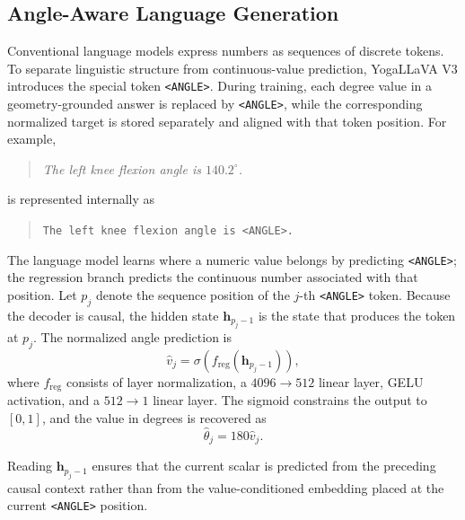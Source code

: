 \subsection{Angle-Aware Language Generation}
\label{sec:angle_generation}

Conventional language models express numbers as sequences of discrete
tokens. To separate linguistic structure from continuous-value
prediction, YogaLLaVA V3 introduces the special token
\texttt{<ANGLE>}. During training, each degree value in a
geometry-grounded answer is replaced by \texttt{<ANGLE>}, while the
corresponding normalized target is stored separately and aligned with
that token position. For example,
\begin{quote}
\small
\textit{The left knee flexion angle is $140.2^\circ$.}
\end{quote}
is represented internally as
\begin{quote}
\small
\texttt{The left knee flexion angle is <ANGLE>.}
\end{quote}

The language model learns where a numeric value belongs by predicting
\texttt{<ANGLE>}; the regression branch predicts the continuous number
associated with that position. Let $p_j$ denote the sequence position of
the $j$-th \texttt{<ANGLE>} token. Because the decoder is causal, the
hidden state $\mathbf{h}_{p_j-1}$ is the state that produces the token at
$p_j$. The normalized angle prediction is
\begin{equation}
    \widehat{v}_j
    =
    \sigma\!\left(
        f_{\mathrm{reg}}
        \left(
            \mathbf{h}_{p_j-1}
        \right)
    \right),
    \label{eq:angle_regression}
\end{equation}
where $f_{\mathrm{reg}}$ consists of layer normalization, a
$4096\!\rightarrow\!512$ linear layer, GELU activation, and a
$512\!\rightarrow\!1$ linear layer. The sigmoid constrains the output to
$[0,1]$, and the value in degrees is recovered as
\begin{equation}
    \widehat{\theta}_j
    =
    180\widehat{v}_j.
    \label{eq:angle_denormalization}
\end{equation}

Reading $\mathbf{h}_{p_j-1}$ ensures that the current scalar is predicted
from the preceding causal context rather than from the value-conditioned
embedding placed at the current \texttt{<ANGLE>} position.

